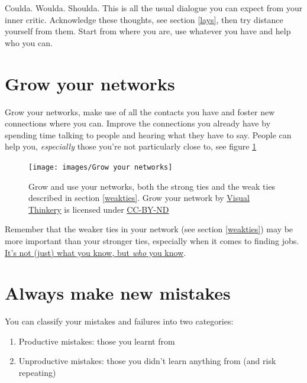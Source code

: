 \documentclass[
]{book}
\providecommand{\tightlist}{%
  \setlength{\itemsep}{0pt}\setlength{\parskip}{0pt}}
\begin{document}
Coulda. Woulda. Shoulda. This is all the usual dialogue you can expect from your inner critic. Acknowledge these thoughts, see section \ref{lays}, then try distance yourself from them. Start from where you are, use whatever you have and help who you can.

\hypertarget{networking}{%
\section{Grow your networks}\label{networking}}

Grow your networks, make use of all the contacts you have and foster new connections where you can. Improve the connections you already have by spending time talking to people and hearing what they have to say. People can help you, \emph{especially} those you're not particularly close to, see figure \ref{fig:yournetwork-fig}

\begin{figure}

{\centering \texttt{[image: images/Grow your networks]} 

}

\caption{Grow and use your networks, both the strong ties and the weak ties described in section \ref{weakties}. Grow your network by \href{https://visualthinkery.com}{Visual Thinkery} is licensed under \href{https://creativecommons.org/licenses/by-nd/4.0/}{CC-BY-ND}}\label{fig:yournetwork-fig}
\end{figure}



Remember that the weaker ties in your network (see section \ref{weakties}) may be more important than your stronger ties, especially when it comes to finding jobs. \href{https://en.wiktionary.org/wiki/it\%27s_not_what_you_know_but_who_you_know}{It's not (just) what you know, but \emph{who} you know}.

\hypertarget{estherdyson}{%
\section{Always make new mistakes}\label{estherdyson}}

You can classify your mistakes and failures into two categories:

\begin{enumerate}
\def\labelenumi{\arabic{enumi}.}
\tightlist
\item
  Productive mistakes: those you learnt from
\item
  Unproductive mistakes: those you didn't learn anything from (and risk repeating)
\end{enumerate}
\end{document}
